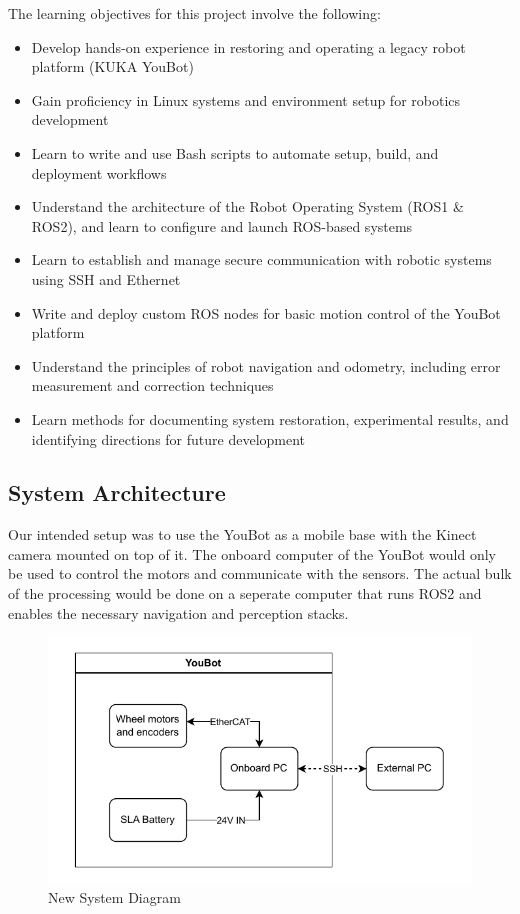 \documentclass[a4paper, 12pt]{article}
\begin{document}
    The learning objectives for this project involve the following:
    \begin{itemize}[noitemsep, topsep=0pt]
        \item Develop hands-on experience in restoring and operating a legacy robot platform (KUKA YouBot)
        \item Gain proficiency in Linux systems and environment setup for robotics development
        \item Learn to write and use Bash scripts to automate setup, build, and deployment workflows
        \item Understand the architecture of the Robot Operating System (ROS1 \& ROS2), and learn to configure and launch ROS-based systems
        \item Learn to establish and manage secure communication with robotic systems using SSH and Ethernet
        \item Write and deploy custom ROS nodes for basic motion control of the YouBot platform
        \item Understand the principles of robot navigation and odometry, including error measurement and correction techniques
        \item Learn methods for documenting system restoration, experimental results, and identifying directions for future development
    \end{itemize}

    \subsection{System Architecture}
    Our intended setup was to use the YouBot as a mobile base with the Kinect camera mounted on top of it. The onboard computer of the YouBot would only be used to control the motors and communicate with the sensors. The actual bulk of the processing would be done on a seperate computer that runs ROS2 and enables the necessary navigation and perception stacks.
    
    \begin{figure}[ht]
        \centering
        \includegraphics[width=\linewidth]{diagrams/new_arch.drawio.pdf}
        \caption{New System Diagram}
        \label{fig:new-system-diagram}
    \end{figure}
\end{document}
